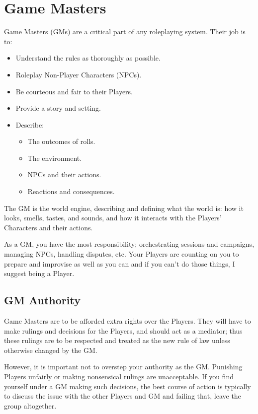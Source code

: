 \documentclass[../main.tex]{subfiles}
\begin{document}
    \section{Game Masters}

    Game Masters (GMs) are a critical part of any roleplaying system. Their job is to:

    \begin{itemize}
        \item Understand the rules as thoroughly as possible.
        \item Roleplay Non-Player Characters (NPCs).
        \item Be courteous and fair to their Players.
        \item Provide a story and setting.
        \item Describe:
        \begin{itemize}
            \item The outcomes of rolls.
            \item The environment.
            \item NPCs and their actions.
            \item Reactions and consequences.
        \end{itemize}
    \end{itemize}
    
    The GM is the world engine, describing and defining what the world is: how it looks, smells, tastes, and sounds, and how it interacts with the Players' Characters and their actions.
    
    As a GM, you have the most responsibility; orchestrating sessions and campaigns, managing NPCs, handling disputes, etc. Your Players are counting on you to prepare and improvise as well as you can and if you can't do those things, I suggest being a Player.
    
    \subsection{GM Authority}
    Game Masters are to be afforded extra rights over the Players. They will have to make rulings and decisions for the Players, and should act as a mediator; thus these rulings are to be respected and treated as the new rule of law unless otherwise changed by the GM.

    However, it is important not to overstep your authority as the GM. Punishing Players unfairly or making nonsensical rulings are unacceptable. If you find yourself under a GM making such decisions, the best course of action is typically to discuss the issue with the other Players and GM and failing that, leave the group altogether.
\end{document}
